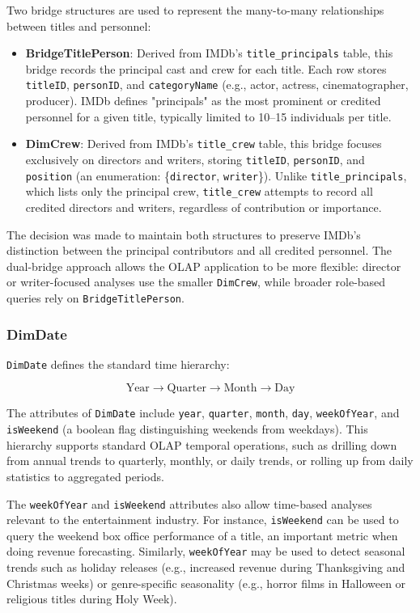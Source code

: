 Two bridge structures are used to represent the many-to-many relationships between titles and personnel:

\begin{itemize}
    \item \textbf{BridgeTitlePerson}: Derived from IMDb's \verb|title_principals| table, this bridge records the principal cast and crew for each title. Each row stores \verb|titleID|, \verb|personID|, and \verb|categoryName| (e.g., actor, actress, cinematographer, producer). IMDb defines "principals" as the most prominent or credited personnel for a given title, typically limited to 10–15 individuals per title.
    
    \item \textbf{DimCrew}: Derived from IMDb's \verb|title_crew| table, this bridge focuses exclusively on directors and writers, storing \verb|titleID|, \verb|personID|, and \verb|position| (an enumeration: \{\verb|director|, \verb|writer|\}). Unlike \verb|title_principals|, which lists only the principal crew, \verb|title_crew| attempts to record all credited directors and writers, regardless of contribution or importance.
\end{itemize}

The decision was made to maintain both structures to preserve IMDb’s distinction between the principal contributors and all credited personnel. The dual-bridge approach allows the OLAP application to be more flexible: director or writer-focused analyses use the smaller \verb|DimCrew|, while broader role-based queries rely on \verb|BridgeTitlePerson|.

\subsubsection{DimDate}

\verb|DimDate| defines the standard time hierarchy:

\[
\text{Year} \rightarrow \text{Quarter} \rightarrow \text{Month} \rightarrow \text{Day}
\]

The attributes of \verb|DimDate| include \verb|year|, \verb|quarter|, \verb|month|, \verb|day|, \verb|weekOfYear|, and \verb|isWeekend| (a boolean flag distinguishing weekends from weekdays). This hierarchy supports standard OLAP temporal operations, such as drilling down from annual trends to quarterly, monthly, or daily trends, or rolling up from daily statistics to aggregated periods.

The \verb|weekOfYear| and \verb|isWeekend| attributes also allow time-based analyses relevant to the entertainment industry. For instance, \verb|isWeekend| can be used to query the weekend box office performance of a title, an important metric when doing revenue forecasting. Similarly, \verb|weekOfYear| may be used to detect seasonal trends such as holiday releases (e.g., increased revenue during Thanksgiving and Christmas weeks) or genre-specific seasonality (e.g., horror films in Halloween or religious titles during Holy Week).

